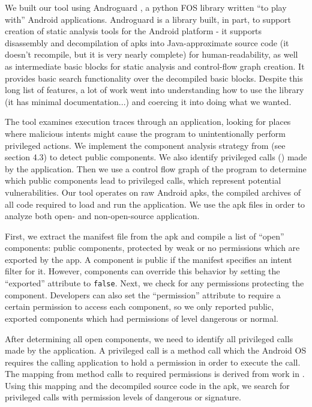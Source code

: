 \documentclass[12pt,a4paper]{article}
\begin{document}
We built our tool using Androguard \cite{androguard}, a
python FOS library written ``to play with'' Android applications. Androguard is
a library built, in part, to support creation of static analysis tools for the
Android platform - it supports disassembly and decompilation of apks into
Java-approximate source code (it doesn't recompile, but it is very nearly
complete) for human-readability, as well as intermediate basic blocks for static
analysis and control-flow graph creation. It provides basic search functionality
over the decompiled basic blocks. Despite this long list of features, a lot of
work went into understanding how to use the library (it has minimal
documentation...) and coercing it into doing what we wanted.

The tool examines execution traces through an application, looking for places
where malicious intents might cause the program to unintentionally perform
privileged actions. We implement the component analysis strategy from
\cite{chin_analyzing_2011} (see section 4.3) to detect public components. We
also identify privileged calls (\cite{felt_android_2011}) made by the
application. Then we use a control flow graph of the program to determine which
public components lead to privileged calls, which represent potential
vulnerabilities. Our tool operates on raw Android apks, the compiled archives of
all code required to load and run the application. We use the apk files in order
to analyze both open- and non-open-source application.

First, we extract the manifest file from the apk and compile a list of ``open''
components: public components, protected by weak or no permissions which are
exported by the app. A component is public if the manifest specifies an intent
filter for it. However, components can override this behavior by setting the
``exported'' attribute to \texttt{false}. Next, we check for any permissions
protecting the component. Developers can also set the ``permission'' attribute
to require a certain permission to access each component, so we only reported
public, exported components which had permissions of level dangerous or normal.

After determining all open components, we need to identify all privileged calls
made by the application. A privileged call is a method call which the Android OS
requires the calling application to hold a permission in order to execute
the call. The mapping from method calls to required permissions is
derived from work in \cite{felt_android_2011}. Using this mapping and the
decompiled source code in the apk, we search for privileged calls with
permission levels of dangerous or signature.
\end{document}
